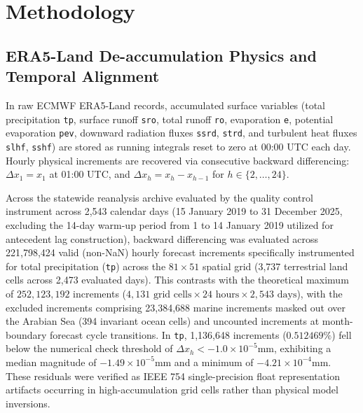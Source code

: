 \documentclass[pdflatex,sn-mathphys,Numbered]{sn-jnl}
\begin{document}
\section{Methodology}\label{sec3}

\subsection{ERA5-Land De-accumulation Physics and Temporal Alignment}
In raw ECMWF ERA5-Land records, accumulated surface variables (total precipitation \texttt{tp}, surface runoff \texttt{sro}, total runoff \texttt{ro}, evaporation \texttt{e}, potential evaporation \texttt{pev}, downward radiation fluxes \texttt{ssrd}, \texttt{strd}, and turbulent heat fluxes \texttt{slhf}, \texttt{sshf}) are stored as running integrals reset to zero at 00:00 UTC each day. Hourly physical increments are recovered via consecutive backward differencing: $\Delta x_1 = x_1$ at 01:00 UTC, and $\Delta x_h = x_h - x_{h-1}$ for $h \in \{2, \dots, 24\}$.

Across the statewide reanalysis archive evaluated by the quality control instrument across 2,543 calendar days (15 January 2019 to 31 December 2025, excluding the 14-day warm-up period from 1 to 14 January 2019 utilized for antecedent lag construction), backward differencing was evaluated across 221,798,424 valid (non-NaN) hourly forecast increments specifically instrumented for total precipitation (\texttt{tp}) across the $81 \times 51$ spatial grid (3,737 terrestrial land cells across 2,473 evaluated days). This contrasts with the theoretical maximum of $252,123,192$ increments ($4,131\text{ grid cells} \times 24\text{ hours} \times 2,543\text{ days}$), with the excluded increments comprising 23,384,688 marine increments masked out over the Arabian Sea (394 invariant ocean cells) and uncounted increments at month-boundary forecast cycle transitions. In \texttt{tp}, 1,136,648 increments ($0.512469\%$) fell below the numerical check threshold of $\Delta x_h < -1.0 \times 10^{-5}$\;mm, exhibiting a median magnitude of $-1.49 \times 10^{-5}$\;mm and a minimum of $-4.21 \times 10^{-4}$\;mm. These residuals were verified as IEEE 754 single-precision float representation artifacts occurring in high-accumulation grid cells rather than physical model inversions.
\end{document}

